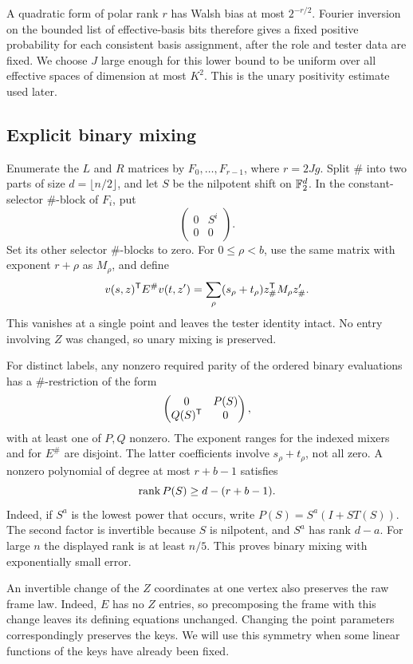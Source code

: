 A quadratic form of polar rank \(r\) has Walsh bias at most \(2^{-r/2}\).
Fourier inversion on the bounded list of effective-basis bits therefore
gives a fixed positive probability for each consistent basis assignment,
after the role and tester data are fixed. We choose \(J\) large enough
for this lower bound to be uniform over all effective spaces of dimension
at most \(K^2\). This is the unary positivity estimate used later.

\subsection{Explicit binary mixing}

Enumerate the \(L\) and \(R\) matrices by \(F_0,\ldots,F_{r-1}\), where
\(r=2Jg\). Split \(\#\) into two parts of size \(d=\lfloor n/2\rfloor\),
and let \(S\) be the nilpotent shift on \(\mathbb F_2^d\). In the constant-selector
\(\#\)-block of \(F_i\), put
\[
 \begin{pmatrix}0&S^i\\0&0\end{pmatrix}.
\]
Set its other selector \(\#\)-blocks to zero. For \(0\le\rho<b\), use
the same matrix with exponent \(r+\rho\) as \(M_\rho\), and define
\[
 v(s,z)^{\mathsf T} E^\#v(t,z')
   =\sum_\rho(s_\rho+t_\rho)z_\#^{\mathsf T} M_\rho z'_\#.
\]
This vanishes at a single point and leaves the tester identity intact.
No entry involving \(Z\) was changed, so unary mixing is preserved.

For distinct labels, any nonzero required parity of the ordered binary
evaluations has a \(\#\)-restriction of the form
\[
 \begin{pmatrix}0&P(S)\\Q(S)^{\mathsf T}&0\end{pmatrix},
\]
with at least one of \(P,Q\) nonzero. The exponent ranges for the indexed
mixers and for \(E^\#\) are disjoint. The latter coefficients involve
\(s_\rho+t_\rho\), not all zero. A nonzero polynomial of degree at most
\(r+b-1\) satisfies
\[
 \operatorname{rank} P(S)\ge d-(r+b-1).
\]
Indeed, if \(S^a\) is the lowest power that occurs, write
\(P(S)=S^a(I+ST(S))\). The second factor is invertible because \(S\)
is nilpotent, and \(S^a\) has rank \(d-a\). For large \(n\) the displayed
rank is at least \(n/5\). This proves binary mixing with exponentially
small error.

An invertible change of the \(Z\) coordinates at one vertex also
preserves the raw frame law. Indeed, \(E\) has no \(Z\) entries, so
precomposing the frame with this change leaves its defining equations
unchanged. Changing the point parameters correspondingly preserves the
keys. We will use this symmetry when some linear functions of the keys
have already been fixed.
